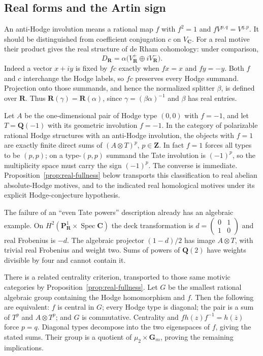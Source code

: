 \documentclass[11pt]{article}
\theoremstyle{definition}\newtheorem{definition}[theorem]{Definition}
\theoremstyle{remark}\newtheorem{remark}[theorem]{Remark}
\newcommand{\Q}{\mathbf Q}\newcommand{\Z}{\mathbf Z}
\newcommand{\R}{\mathbf R}\newcommand{\C}{\mathbf C}
\newcommand{\Gm}{\mathbf G_m}\newcommand{\B}{\mathrm B}\newcommand{\dR}{\mathrm{dR}}
\DeclareMathOperator{\Spec}{Spec}\DeclareMathOperator{\Res}{Res}
\begin{document}
\subsection{Real forms and the Artin sign}\label{sec:real-artin-sign}
An anti-Hodge involution means a rational map $f$ with $f^2=1$ and $fV^{p,q}=V^{q,p}$. It should be distinguished from coefficient conjugation $c$ on $V_\C$. For a real motive their product gives the real structure of de Rham cohomology: under comparison,
\[
 D_\R=\alpha\bigl(V^+_\R\oplus iV^-_\R\bigr).
\]
Indeed a vector $x+iy$ is fixed by $fc$ exactly when $fx=x$ and $fy=-y$. Both $f$ and $c$ interchange the Hodge labels, so $fc$ preserves every Hodge summand. Projection onto those summands, and hence the normalized splitter $\beta$, is defined over $\R$. Thus $\R(\gamma)=\R(\alpha)$, since $\gamma=(\beta\alpha)^{-1}$ and $\beta$ has real entries.

Let $A$ be the one-dimensional pair of Hodge type $(0,0)$ with $f=-1$, and let $T=\Q(-1)$ with its geometric involution $f=-1$. In the category of polarizable rational Hodge structures with an anti-Hodge involution, the objects with $f=1$ are exactly finite direct sums of $(A\otimes T)^p$, $p\in\Z$. In fact $f=1$ forces all types to be $(p,p)$; on a type-$(p,p)$ summand the Tate involution is $(-1)^p$, so the multiplicity space must carry the sign $(-1)^p$. The converse is immediate. Proposition~\ref{prop:real-fullness} below transports this classification to real abelian absolute-Hodge motives, and to the indicated real homological motives under its explicit Hodge-conjecture hypothesis.

The failure of an ``even Tate powers'' description already has an algebraic example. On $H^2(\mathbf P^1_\R\times\Spec\C)$ the deck transformation is $d=\left(\begin{smallmatrix}0&1\\1&0\end{smallmatrix}\right)$ and real Frobenius is $-d$. The algebraic projector $(1-d)/2$ has image $A\otimes T$, with trivial real Frobenius and weight two. Sums of powers of $\Q(2)$ have weights divisible by four and cannot contain it.

There is a related centrality criterion, transported to those same motivic categories by Proposition~\ref{prop:real-fullness}. Let $G$ be the smallest rational algebraic group containing the Hodge homomorphism and $f$. Then the following are equivalent: $f$ is central in $G$; every Hodge type is diagonal; the pair is a sum of $T^p$ and $A\otimes T^p$; and $G$ is commutative. Centrality and $fh(z)f^{-1}=h(\overline z)$ force $p=q$. Diagonal types decompose into the two eigenspaces of $f$, giving the stated sums. Their group is a quotient of $\mu_2\times\Gm$, proving the remaining implications.
\end{document}
